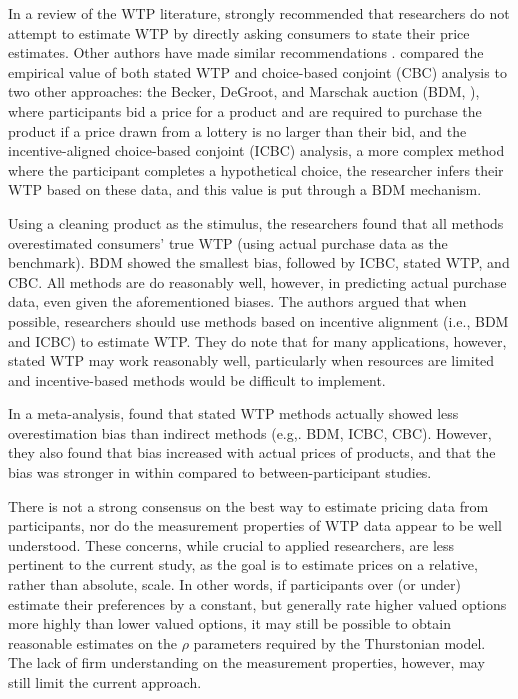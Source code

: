 In a review of the WTP literature, \textcite{breidertREVIEWMETHODSMEASURING2006} strongly recommended that researchers do not attempt to estimate WTP by directly asking consumers to state their price estimates. Other authors have made similar recommendations \textcite{jedidi2009willingness}. \textcite{miller2011should} compared the empirical value of both stated WTP and choice-based conjoint (CBC) analysis to two other approaches: the Becker, DeGroot, and Marschak auction (BDM, \textcite{becker1964measuring}), where participants bid a price for a product and are required to purchase the product if a price drawn from a lottery is no larger than their bid, and the incentive-aligned choice-based conjoint (ICBC) analysis, a more complex method where the participant completes a hypothetical choice, the researcher infers their WTP based on these data, and this value is put through a BDM mechanism. 

Using a cleaning product as the stimulus, the researchers found that all methods overestimated consumers' true WTP (using actual purchase data as the benchmark). BDM showed the smallest bias, followed by ICBC, stated WTP, and CBC. All methods are do reasonably well, however, in predicting actual purchase data, even given the aforementioned biases. The authors argued that when possible, researchers should use methods based on incentive alignment (i.e., BDM and ICBC) to estimate WTP. They do note that for many applications, however, stated WTP may work reasonably well, particularly when resources are limited and incentive-based methods would be difficult to implement.

In a meta-analysis, \textcite{schmidtAccuratelyMeasuringWillingness2020} found that stated WTP methods actually showed less overestimation bias than indirect methods (e.g,. BDM, ICBC, CBC). However, they also found that bias increased with actual prices of products, and that the bias was stronger in within compared to between-participant studies.

There is not a strong consensus on the best way to estimate pricing data from participants, nor do the measurement properties of WTP data appear to be well understood. These concerns, while crucial to applied researchers, are less pertinent to the current study, as the goal is to estimate prices on a relative, rather than absolute, scale. In other words, if participants over (or under) estimate their preferences by a constant, but generally rate higher valued options more highly than lower valued options, it may still be possible to obtain reasonable estimates on the $\rho$ parameters required by the Thurstonian model. The lack of firm understanding on the measurement properties, however, may still limit the current approach. 

